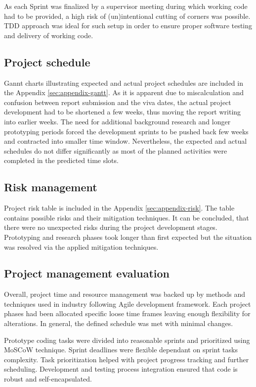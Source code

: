 		As each Sprint was finalized by a supervisor meeting during which working code had to be provided, a high risk of (un)intentional cutting of corners was possible. TDD approach was ideal for such setup in order to ensure proper software testing and delivery of working code.
		
	\subsection{Project schedule}
		Gannt charts illustrating expected and actual project schedules are included in the Appendix \ref{sec:appendix-gantt}. As it is apparent due to miscalculation and confusion between report submission and the viva dates, the actual project development had to be shortened a few weeks, thus moving the report writing into earlier weeks. The need for additional background research and longer prototyping periods forced the development sprints to be pushed back few weeks and contracted into smaller time window. Nevertheless, the expected and actual schedules do not differ significantly as most of the planned activities were completed in the predicted time slots.
		
	\subsection{Risk management}
		Project risk table is included in the Appendix \ref{sec:appendix-risk}. The table contains possible risks and their mitigation techniques. It can be concluded, that there were no unexpected risks during the project development stages. Prototyping and research phases took longer than first expected but the situation was resolved via the applied mitigation techniques.
		
	\subsection{Project management evaluation}
		Overall, project time and resource management was backed up by methods and techniques used in industry following Agile development framework. Each project phases had been allocated specific loose time frames leaving enough flexibility for alterations. In general, the defined schedule was met with minimal changes. 
		
		Prototype coding tasks were divided into reasonable sprints and prioritized using MoSCoW technique. Sprint deadlines were flexible dependant on sprint tasks complexity. Task prioritization helped with project progress tracking and further scheduling. Development and testing process integration ensured that code is robust and self-encapsulated.
		
